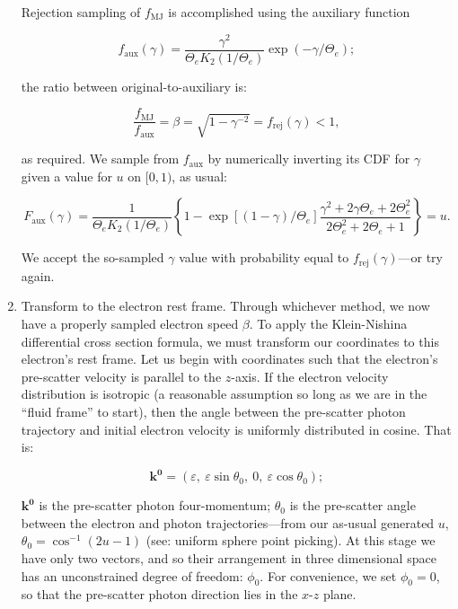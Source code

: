 \documentclass[letterpaper]{article}
\begin{document}
\begin{enumerate}
\noindent Rejection sampling of $f_\mathrm{MJ}$ is accomplished using the auxiliary function

\begin{equation}
f_\mathrm{aux}(\gamma) = \frac{\gamma^2}{\Theta_e K_2(1/\Theta_e)} \exp(-\gamma/\Theta_e);
\end{equation}

\noindent the ratio between original-to-auxiliary is:

\begin{equation}
\frac{f_\mathrm{MJ}}{f_\mathrm{aux}} = \beta = \sqrt{1 - \gamma^{-2}} = f_\mathrm{rej} (\gamma) < 1,
\end{equation}

\noindent as required. We sample from $f_\mathrm{aux}$ by numerically inverting its CDF for $\gamma$ given a value for $u$ on $[0, 1)$, as usual:

\begin{equation}
F_\mathrm{aux} (\gamma) = \frac{1}{\Theta_e K_2(1/\Theta_e)} \left\lbrace 1 - \exp \left[\left(1 - \gamma\right)/\Theta_e\right] \frac{\gamma^2 + 2\gamma\Theta_e + 2\Theta_e^2}{2\Theta_e^2 + 2\Theta_e + 1} \right\rbrace = u.
\end{equation}

We accept the so-sampled $\gamma$ value with probability equal to $f_\mathrm{rej} (\gamma)$---or try again.

\item Transform to the electron rest frame. Through whichever method, we now have a properly sampled electron speed $\beta$. To apply the Klein-Nishina differential cross section formula, we must transform our coordinates to this electron's rest frame. Let us begin with coordinates such that the electron's pre-scatter velocity is parallel to the $z$-axis. If the electron velocity distribution is isotropic (a reasonable assumption so long as we are in the ``fluid frame'' to start), then the angle between the pre-scatter photon trajectory and initial electron velocity is uniformly distributed in cosine. That is:

\begin{equation}
\mathbf{k^0} = (\varepsilon,\ \varepsilon \sin \theta_0,\ 0,\ \varepsilon \cos \theta_0);
\end{equation}

\noindent $\mathbf{k^0}$ is the pre-scatter photon four-momentum; $\theta_0$ is the pre-scatter angle between the electron and photon trajectories---from our as-usual generated $u$, $\theta_0 = \cos^{-1} (2u-1)$ (see: uniform sphere point picking). At this stage we have only two vectors, and so their arrangement in three dimensional space has an unconstrained degree of freedom: $\phi_0$. For convenience, we set $\phi_0 = 0$, so that the pre-scatter photon direction lies in the $x$-$z$ plane.


\end{enumerate}
\end{document}
